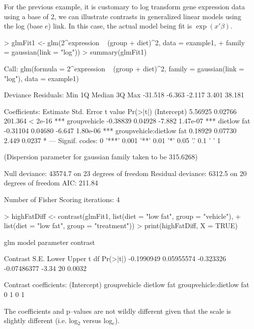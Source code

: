 \documentclass[12pt]{article}
\begin{document}
For the previous example, it is customary to log transform gene expression data using a base of 2, we can illustrate contrasts in generalized linear models using the log (base $e$) link. In this case, the actual model being fit is $\exp(x'\beta)$. 
{\small 
\begin{Schunk}
\begin{Sinput}
> glmFit1 <- glm(2^expression ~ (group + diet)^2, data = example1, 
+     family = gaussian(link = "log"))
> summary(glmFit1)
\end{Sinput}
\begin{Soutput}
Call:
glm(formula = 2^expression ~ (group + diet)^2, family = gaussian(link = "log"), 
    data = example1)

Deviance Residuals: 
    Min       1Q   Median       3Q      Max  
-31.518   -6.363   -2.117    3.401   38.181  

Coefficients:
                         Estimate Std. Error t value Pr(>|t|)    
(Intercept)               5.56925    0.02766 201.364  < 2e-16 ***
groupvehicle             -0.38839    0.04928  -7.882 1.47e-07 ***
dietlow fat              -0.31104    0.04680  -6.647 1.80e-06 ***
groupvehicle:dietlow fat  0.18929    0.07730   2.449   0.0237 *  
---
Signif. codes:  0 '***' 0.001 '**' 0.01 '*' 0.05 '.' 0.1 ' ' 1 

(Dispersion parameter for gaussian family taken to be 315.6268)

    Null deviance: 43574.7  on 23  degrees of freedom
Residual deviance:  6312.5  on 20  degrees of freedom
AIC: 211.84

Number of Fisher Scoring iterations: 4
\end{Soutput}
\begin{Sinput}
> highFatDiff <- contrast(glmFit1, list(diet = "low fat", group = "vehicle"), 
+     list(diet = "low fat", group = "treatment"))
> print(highFatDiff, X = TRUE)
\end{Sinput}
\begin{Soutput}
glm model parameter contrast

   Contrast       S.E.     Lower       Upper     t df Pr(>|t|)
 -0.1990949 0.05955574 -0.323326 -0.07486377 -3.34 20   0.0032

Contrast coefficients:
 (Intercept) groupvehicle dietlow fat groupvehicle:dietlow fat
           0            1           0                        1
\end{Soutput}
\end{Schunk}
}

The coefficients and p--values are not wildly different given that the scale is slightly different (i.e. log$_2$ versus log$_e$).
\end{document}
